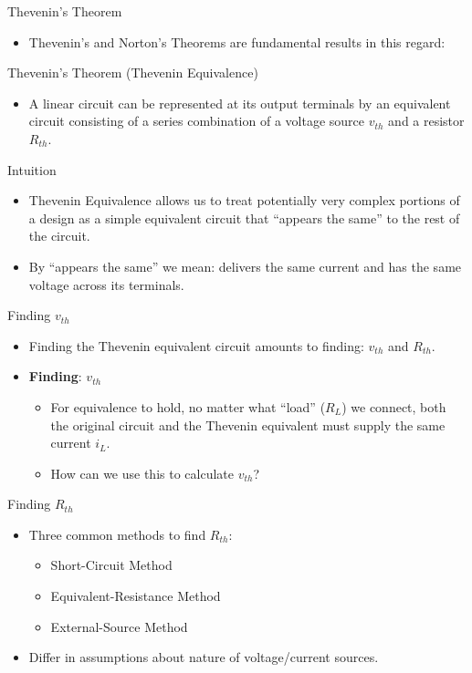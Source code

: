 \documentclass[xcolor=dvipsnames,notheorems,aspectratio=169]{beamer}
\begin{document}
\begin{frame}{Thevenin's Theorem}
\begin{itemize}
    \item Thevenin's and Norton's Theorems are fundamental results in this regard:
\end{itemize}
\begin{orangebox}{Thevenin's Theorem (Thevenin Equivalence)}
    \begin{itemize}
        \item A linear circuit can be represented at its output terminals by an equivalent circuit consisting of a series combination of a voltage source $v_{th}$ and a resistor $R_{th}$.
    \end{itemize}
\end{orangebox}
\begin{greenbox}{Intuition}
\begin{itemize}
    \item Thevenin Equivalence allows us to treat potentially very complex portions of a design as a simple equivalent circuit that ``appears the same'' to the rest of the circuit.
    \item By ``appears the same'' we mean: delivers the same current and has the same voltage across its terminals.
\end{itemize}
\end{greenbox}
\end{frame}

\begin{frame}[t]{Finding $v_{th}$}
\begin{itemize}
    \item Finding the Thevenin equivalent circuit amounts to finding: $v_{th}$ and $R_{th}$.
    \item \textbf{Finding}: $v_{th}$
    \begin{itemize}
        \item For equivalence to hold, no matter what ``load'' ($R_{L}$) we connect, both the original circuit and the Thevenin equivalent must supply the same current $i_{L}$.
        \item How can we use this to calculate $v_{th}$?
    \end{itemize}
\end{itemize}
\end{frame}

\begin{frame}{Finding $R_{th}$}
\begin{itemize}
    \item Three common methods to find $R_{th}$:
    \begin{itemize}
        \item[(1)] Short-Circuit Method
        \item[(2)] Equivalent-Resistance Method
        \item[(3)] External-Source Method
    \end{itemize}
    \item Differ in assumptions about nature of voltage/current sources. 
\end{itemize}
\end{frame}
\end{document}
